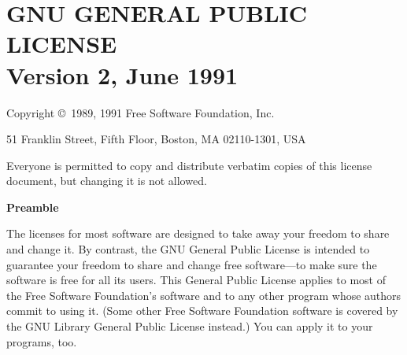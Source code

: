 %
%
%
%
%

\chapter[GNU General Public License, version 2]{GNU GENERAL PUBLIC LICENSE\\
{\Large Version 2, June 1991}} \label{gplfull}


\begin{center}
  {\parindent 0in

    Copyright \copyright\ 1989, 1991 Free Software Foundation, Inc.

    \bigskip

    51 Franklin Street, Fifth Floor, Boston, MA  02110-1301, USA

    \bigskip

    Everyone is permitted to copy and distribute verbatim copies
    of this license document, but changing it is not allowed.
  }
\end{center}

\begin{center}
  {\bf\large Preamble}
\end{center}


The licenses for most software are designed to take away your freedom to
share and change it.  By contrast, the GNU General Public License is
intended to guarantee your freedom to share and change free software---to
make sure the software is free for all its users.  This General Public
License applies to most of the Free Software Foundation's software and to
any other program whose authors commit to using it.  (Some other Free
Software Foundation software is covered by the GNU Library General Public
License instead.)  You can apply it to your programs, too.

